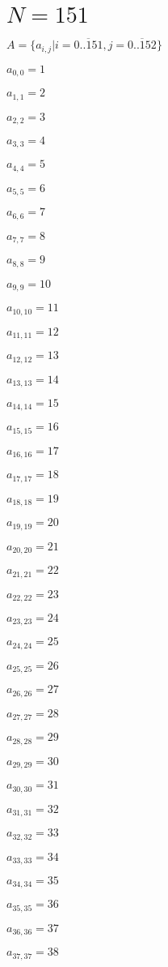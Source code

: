\documentclass[a4paper,12pt]{article}
\begin{document}
\section{ $N = 151$ }
$A = \{ a _{ i, j } | i = \overline { 0..151 }, j = \overline { 0..152 } \}$

$a _{ 0, 0 } = 1$

$a _{ 1, 1 } = 2$

$a _{ 2, 2 } = 3$

$a _{ 3, 3 } = 4$

$a _{ 4, 4 } = 5$

$a _{ 5, 5 } = 6$

$a _{ 6, 6 } = 7$

$a _{ 7, 7 } = 8$

$a _{ 8, 8 } = 9$

$a _{ 9, 9 } = 10$

$a _{ 10, 10 } = 11$

$a _{ 11, 11 } = 12$

$a _{ 12, 12 } = 13$

$a _{ 13, 13 } = 14$

$a _{ 14, 14 } = 15$

$a _{ 15, 15 } = 16$

$a _{ 16, 16 } = 17$

$a _{ 17, 17 } = 18$

$a _{ 18, 18 } = 19$

$a _{ 19, 19 } = 20$

$a _{ 20, 20 } = 21$

$a _{ 21, 21 } = 22$

$a _{ 22, 22 } = 23$

$a _{ 23, 23 } = 24$

$a _{ 24, 24 } = 25$

$a _{ 25, 25 } = 26$

$a _{ 26, 26 } = 27$

$a _{ 27, 27 } = 28$

$a _{ 28, 28 } = 29$

$a _{ 29, 29 } = 30$

$a _{ 30, 30 } = 31$

$a _{ 31, 31 } = 32$

$a _{ 32, 32 } = 33$

$a _{ 33, 33 } = 34$

$a _{ 34, 34 } = 35$

$a _{ 35, 35 } = 36$

$a _{ 36, 36 } = 37$

$a _{ 37, 37 } = 38$
\end{document}
